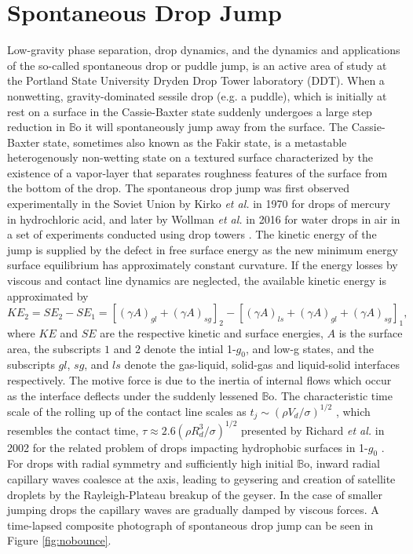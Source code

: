 \documentclass[12pt,a4paper,oneside]{book}
\begin{document}
\section{Spontaneous Drop Jump}
Low-gravity phase separation, drop dynamics, and the dynamics and applications of the so-called spontaneous drop or puddle jump, is an active area of study at the Portland State University Dryden Drop Tower laboratory (DDT). When a nonwetting, gravity-dominated sessile drop (e.g. a puddle), which is initially at rest on a surface in the Cassie-Baxter state suddenly undergoes a large step reduction in $\mathbb{B}\mbox{o}$ it will spontaneously jump away from the surface. The Cassie-Baxter state, sometimes also known as the Fakir state, is a metastable heterogenously non-wetting state on a textured surface characterized by the existence of a vapor-layer that separates roughness features of the surface from the bottom of the drop. The spontaneous drop jump was first observed experimentally in the Soviet Union by Kirko \emph{et al.} \cite{kirko_phenomenon_1970} in 1970 for drops of mercury in hydrochloric acid, and later by Wollman \emph{et al.} in 2016 for water drops in air in a set of experiments conducted using drop towers \cite{wollman_more_2016}. The kinetic energy of the jump is supplied by the defect in free surface energy as the new minimum energy surface equilibrium has approximately constant curvature. If the energy losses by viscous and contact line dynamics are neglected, the available kinetic energy is approximated by
\[KE_2 = SE_2 - SE_1 = [(\gamma A)_{gl} + (\gamma A)_{sg}]_2 - [(\gamma A)_{ls} + (\gamma A)_{gl} + (\gamma A)_{sg}]_1, \]
where $KE$ and $SE$ are the respective kinetic and surface energies, $A$ is the surface area, the subscripts $1$ and $2$ denote the intial 1-$g_0$, and low-g states, and the subscripts ${gl}$, ${sg}$, and ${ls}$ denote the gas-liquid, solid-gas and liquid-solid interfaces respectively. The motive force is due to the inertia of internal flows which occur as the interface deflects under the suddenly lessened $\mathbb{B}\mbox{o}$. The characteristic time scale of the rolling up of the contact line scales as $t_j \sim (\rho V_d/\sigma)^{1/2}$ \cite{attari_puddle_2016}, which resembles the contact time, $\tau \approx 2.6(\rho R^3_d/\sigma)^{1/2}$ presented by Richard \emph{et al.} in 2002 for the related problem of drops impacting hydrophobic surfaces in 1-$g_0$ \cite{richard_surface_2002}. For drops with radial symmetry and sufficiently high initial $\mathbb{B}\mbox{o}$, inward radial capillary waves coalesce at the axis, leading to geysering and creation of satellite droplets by the Rayleigh-Plateau breakup of the geyser. In the case of smaller jumping drops the capillary waves are gradually damped by viscous forces. A time-lapsed composite photograph of spontaneous drop jump can be seen in Figure \ref{fig:nobounce}.
\end{document}
